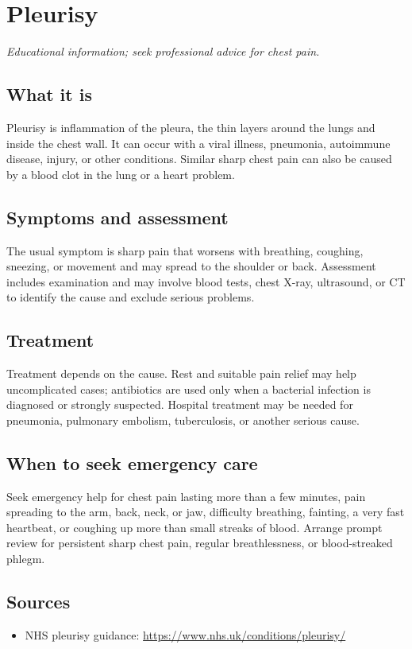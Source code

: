 \chapter{Pleurisy}

\medskip
\noindent\textit{Educational information; seek professional advice for chest pain.}

\section*{What it is}
Pleurisy is inflammation of the pleura, the thin layers around the lungs and inside the chest wall. It can occur with a viral illness, pneumonia, autoimmune disease, injury, or other conditions. Similar sharp chest pain can also be caused by a blood clot in the lung or a heart problem.

\section*{Symptoms and assessment}
The usual symptom is sharp pain that worsens with breathing, coughing, sneezing, or movement and may spread to the shoulder or back. Assessment includes examination and may involve blood tests, chest X-ray, ultrasound, or CT to identify the cause and exclude serious problems.

\section*{Treatment}
Treatment depends on the cause. Rest and suitable pain relief may help uncomplicated cases; antibiotics are used only when a bacterial infection is diagnosed or strongly suspected. Hospital treatment may be needed for pneumonia, pulmonary embolism, tuberculosis, or another serious cause.

\section*{When to seek emergency care}
Seek emergency help for chest pain lasting more than a few minutes, pain spreading to the arm, back, neck, or jaw, difficulty breathing, fainting, a very fast heartbeat, or coughing up more than small streaks of blood. Arrange prompt review for persistent sharp chest pain, regular breathlessness, or blood-streaked phlegm.

\section*{Sources}
\begin{itemize}
\item NHS pleurisy guidance: \url{https://www.nhs.uk/conditions/pleurisy/}
\end{itemize}
